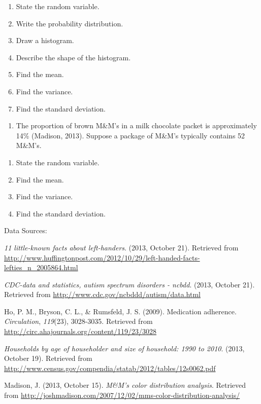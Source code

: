 \documentclass[]{book}
\providecommand{\tightlist}{%
  \setlength{\itemsep}{0pt}\setlength{\parskip}{0pt}}
\begin{document}
\begin{enumerate}
\def\labelenumi{\alph{enumi}.}
\tightlist
\item
  State the random variable.
\item
  Write the probability distribution.
\item
  Draw a histogram.
\item
  Describe the shape of the histogram.
\item
  Find the mean.
\item
  Find the variance.
\item
  Find the standard deviation.
\end{enumerate}

\begin{enumerate}
\def\labelenumi{\arabic{enumi}.}
\setcounter{enumi}{6}
\tightlist
\item
  The proportion of brown M\&M's in a milk chocolate packet is approximately 14\% (Madison, 2013). Suppose a package of M\&M's typically contains 52 M\&M's.
\end{enumerate}

\begin{enumerate}
\def\labelenumi{\alph{enumi}.}
\tightlist
\item
  State the random variable.
\item
  Find the mean.
\item
  Find the variance.
\item
  Find the standard deviation.
\end{enumerate}

Data Sources:

\emph{11 little-known facts about left-handers}. (2013, October 21).
Retrieved from
\url{http://www.huffingtonpost.com/2012/10/29/left-handed-facts-lefties_n_2005864.html}

\emph{CDC-data and statistics, autism spectrum disorders - ncbdd}. (2013,
October 21). Retrieved from \url{http://www.cdc.gov/ncbddd/autism/data.html}

Ho, P. M., Bryson, C. L., \& Rumsfeld, J. S. (2009). Medication
adherence. \emph{Circulation}, \emph{119}(23), 3028-3035. Retrieved from
\url{http://circ.ahajournals.org/content/119/23/3028}

\emph{Households by age of householder and size of household: 1990 to 2010}.
(2013, October 19). Retrieved from
\url{http://www.census.gov/compendia/statab/2012/tables/12s0062.pdf}

Madison, J. (2013, October 15). \emph{M\&M's color distribution analysis}.
Retrieved from
\url{http://joshmadison.com/2007/12/02/mms-color-distribution-analysis/}
\end{document}
